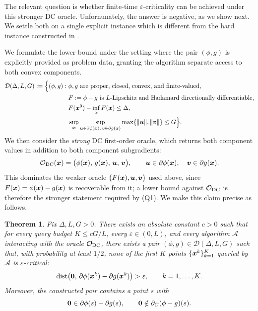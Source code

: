 \documentclass[english]{article}
\newtheorem{theorem}{Theorem}[section]
\begin{document}
The relevant question is whether finite-time $\varepsilon$-criticality can be achieved under this stronger DC oracle. Unfornunately, the answer is negative, as we show next. 
We settle both on a single explicit instance which is different from the hard instance constructed in \cite{Zhang-2020-Complexity}.

We formulate the lower bound under the setting where the pair $(\phi,g)$ is explicitly provided as problem data, granting the algorithm separate access to both convex components. 
\[
\begin{aligned}
\mathcal D(\Delta,L,G) := \Bigl\{ (\phi,g):\;& \phi,g \text{ are proper, closed, convex, and finite-valued},\\
& F:=\phi-g \text{ is } L\text{-Lipschitz and Hadamard directionally differentiable},\\
& F(\bm{x}^0)-\inf\limits_{\bm{x}}F(\bm{x})\le \Delta,\\
& \sup\limits_{\bm{x}} \sup\limits_{\bm{u}\in\partial\phi(\bm{x}),\,\bm{v}\in\partial g(\bm{x})} \max\limits\{\|\bm{u}\|,\|\bm{v}\|\} \le G \Bigr\}.
\end{aligned}
\]
We then consider the \emph{strong} DC first-order oracle, which returns
both component values in addition to both component subgradients:
\[
    \mathcal O_{\rm DC}(\bm{x}) = \bigl( \phi(\bm{x}),\,g(\bm{x}),\,\bm{u},\,\bm{v} \bigr), \qquad \bm{u}\in\partial\phi(\bm{x}),\quad \bm{v}\in\partial g(\bm{x}).
\]
This dominates the weaker oracle $\bigl(F(\bm{x}),\bm{u},\bm{v}\bigr)$ used above, since $F(\bm{x})=\phi(\bm{x})-g(\bm{x})$ is recoverable from it; a lower bound against $\mathcal O_{\rm DC}$ is therefore the stronger statement required by (Q1). We make this claim precise as follows.
\begin{theorem}
\label{thm:dc-oracle-limitation-sketch}
Fix $\Delta,L,G>0$. There exists an absolute constant $c>0$ such that for every query budget $K\le cG/L$, every $\varepsilon\in(0,L)$, and every algorithm $\mathcal{A}$ interacting with the oracle $\mathcal O_{\rm DC}$, there exists a pair $(\phi,g)\in\mathcal D(\Delta,L,G)$ such that, with probability at least $1/2$, none of the first $K$ points $\{\bm{x}^k\}_{k=1}^K$ queried by $\mathcal{A}$ is $\varepsilon$-critical:
\[
    \operatorname{dist}\!\left(
        \bm{0},\,
        \partial\phi(\bm{x}^k)-\partial g(\bm{x}^k)
    \right)
    >
    \varepsilon,
    \qquad k=1,\ldots,K.
\]
Moreover, the constructed pair contains a point $s$ with
\[
    \bm{0}\in\partial\phi(s)-\partial g(s),
    \qquad
    \bm{0}\notin\partial_C(\phi-g)(s).
\]
\end{theorem}
\end{document}
